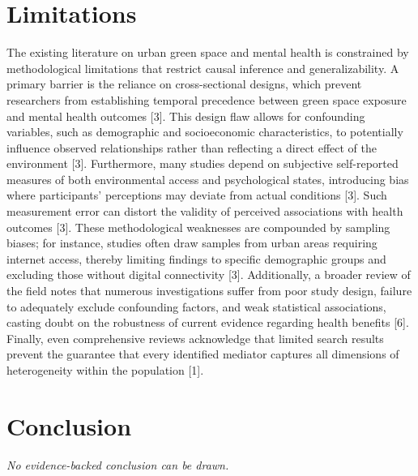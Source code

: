\documentclass[conference]{IEEEtran}
\begin{document}
\section{Limitations}
The existing literature on urban green space and mental health is constrained by methodological limitations that restrict causal inference and generalizability. A primary barrier is the reliance on cross-sectional designs, which prevent researchers from establishing temporal precedence between green space exposure and mental health outcomes [3]. This design flaw allows for confounding variables, such as demographic and socioeconomic characteristics, to potentially influence observed relationships rather than reflecting a direct effect of the environment [3]. Furthermore, many studies depend on subjective self-reported measures of both environmental access and psychological states, introducing bias where participants' perceptions may deviate from actual conditions [3]. Such measurement error can distort the validity of perceived associations with health outcomes [3]. These methodological weaknesses are compounded by sampling biases; for instance, studies often draw samples from urban areas requiring internet access, thereby limiting findings to specific demographic groups and excluding those without digital connectivity [3]. Additionally, a broader review of the field notes that numerous investigations suffer from poor study design, failure to adequately exclude confounding factors, and weak statistical associations, casting doubt on the robustness of current evidence regarding health benefits [6]. Finally, even comprehensive reviews acknowledge that limited search results prevent the guarantee that every identified mediator captures all dimensions of heterogeneity within the population [1].

\section{Conclusion}
\textit{No evidence-backed conclusion can be drawn.}
\end{document}
